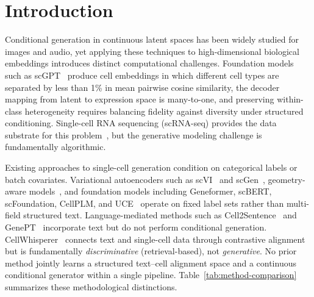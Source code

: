 \section{Introduction}

Conditional generation in continuous latent spaces has been widely studied for images and audio, yet applying these techniques to high-dimensional biological embeddings introduces distinct computational challenges. Foundation models such as scGPT~\citep{ref-scgpt} produce cell embeddings in which different cell types are separated by less than 1\% in mean pairwise cosine similarity, the decoder mapping from latent to expression space is many-to-one, and preserving within-class heterogeneity requires balancing fidelity against diversity under structured conditioning. Single-cell RNA sequencing (scRNA-seq) provides the data substrate for this problem~\citep{ref-scrnaseq-review,ref-10x}, but the generative modeling challenge is fundamentally algorithmic.

Existing approaches to single-cell generation condition on categorical labels or batch covariates. Variational autoencoders such as scVI~\citep{ref-scvi,ref-scvi-tools} and scGen~\citep{ref-scgen}, geometry-aware models~\citep{ref-scdiff}, and foundation models including Geneformer, scBERT, scFoundation, CellPLM, and UCE~\citep{ref-geneformer,ref-scbert,ref-scfoundation,ref-cellplm,ref-uce} operate on fixed label sets rather than multi-field structured text. Language-mediated methods such as Cell2Sentence~\citep{ref-cell2sentence} and GenePT~\citep{ref-genept} incorporate text but do not perform conditional generation. CellWhisperer~\citep{ref-cellwhisperer} connects text and single-cell data through contrastive alignment but is fundamentally \emph{discriminative} (retrieval-based), not \emph{generative}. No prior method jointly learns a structured text--cell alignment space and a continuous conditional generator within a single pipeline. Table~\ref{tab:method-comparison} summarizes these methodological distinctions.

